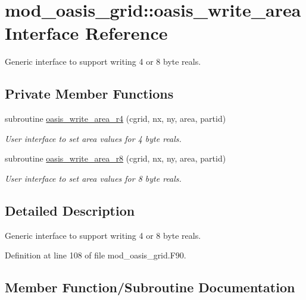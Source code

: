 \hypertarget{interfacemod__oasis__grid_1_1oasis__write__area}{}\section{mod\+\_\+oasis\+\_\+grid\+:\+:oasis\+\_\+write\+\_\+area Interface Reference}
\label{interfacemod__oasis__grid_1_1oasis__write__area}


Generic interface to support writing 4 or 8 byte reals.  


\subsection*{Private Member Functions}
\begin{DoxyCompactItemize}
\item 
subroutine \hyperlink{interfacemod__oasis__grid_1_1oasis__write__area_af355601b9ced09ab6bf152fada2d6d79}{oasis\+\_\+write\+\_\+area\+\_\+r4} (cgrid, nx, ny, area, partid)
\begin{DoxyCompactList}\small\item\em User interface to set area values for 4 byte reals. \end{DoxyCompactList}\item 
subroutine \hyperlink{interfacemod__oasis__grid_1_1oasis__write__area_a52b5ad6f028f6710ae4c17da1062dab4}{oasis\+\_\+write\+\_\+area\+\_\+r8} (cgrid, nx, ny, area, partid)
\begin{DoxyCompactList}\small\item\em User interface to set area values for 8 byte reals. \end{DoxyCompactList}\end{DoxyCompactItemize}


\subsection{Detailed Description}
Generic interface to support writing 4 or 8 byte reals. 

Definition at line 108 of file mod\+\_\+oasis\+\_\+grid.\+F90.



\subsection{Member Function/\+Subroutine Documentation}
\mbox{\label{interfacemod__oasis__grid_1_1oasis__write__area_af355601b9ced09ab6bf152fada2d6d79}} 
